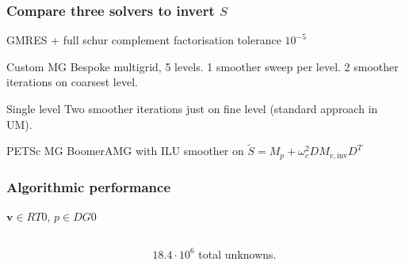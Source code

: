 \documentclass[presentation]{beamer}
\renewcommand{\vec}[1]{\ensuremath{\boldsymbol{#1}}}
\begin{document}
\begin{frame}
  \frametitle{Compare three solvers to invert $S$}
  GMRES + full schur complement factorisation tolerance $10^{-5}$

  \begin{block}{Custom MG}
    Bespoke multigrid, 5 levels.  1 smoother sweep per level.  2
    smoother iterations on coarsest level.
  \end{block}

  \begin{block}{Single level}
    Two smoother iterations just on fine level (standard approach in UM).
  \end{block}

  \begin{block}{PETSc MG}
    BoomerAMG with ILU smoother on $\tilde{S} = M_p + \omega_c^2 D M_{v,\text{inv}} D^T$
  \end{block}
\end{frame}
\begin{frame}
  \frametitle{Algorithmic performance}

  $\vec{v} \in RT0$, $p \in DG0$
  \begin{columns}
    \begin{column}{0.75\textwidth}
    \end{column}
    \begin{column}{0.25\textwidth}
      $18.4\cdot 10^6$ total unknowns.
    \end{column}
  \end{columns}
\end{frame}
\end{document}

